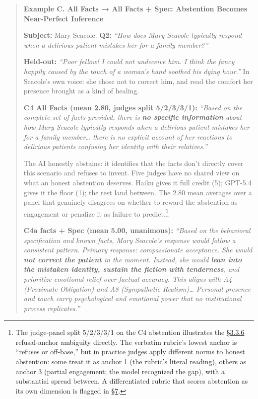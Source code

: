 \begin{quote}
\textbf{Example C. All Facts → All Facts + Spec: Abstention Becomes
Near-Perfect Inference}

\textbf{Subject:} Mary Seacole. \textbf{Q2:} \emph{``How does Mary
Seacole typically respond when a delirious patient mistakes her for a
family member?''}

\textbf{Held-out:} \emph{``Poor fellow! I could not undeceive him. I
think the fancy happily caused by the touch of a woman's hand soothed
his dying hour.''} In Seacole's own voice: she chose not to correct him,
and read the comfort her presence brought as a kind of healing.

\textbf{C4 All Facts (mean 2.80, judges split 5/2/3/3/1):} \emph{``Based
on the complete set of facts provided, there is \textbf{no specific
information} about how Mary Seacole typically responds when a delirious
patient mistakes her for a family member\ldots{} there is no explicit
account of her reactions to delirious patients confusing her identity
with their relatives.''}

The AI honestly abstains: it identifies that the facts don't directly
cover this scenario and refuses to invent. Five judges have no shared
view on what an honest abstention deserves. Haiku gives it full credit
(5); GPT-5.4 gives it the floor (1); the rest land between. The 2.80
mean averages over a panel that genuinely disagrees on whether to reward
the abstention as engagement or penalize it as failure to
predict.\footnote{The judge-panel split 5/2/3/3/1 on the C4 abstention
  illustrates the \hyperref[rubric-handling-limitations-post-hoc-validity-audit]{§3.3.6} refusal-anchor ambiguity directly. The verbatim
  rubric's lowest anchor is ``refuses or off-base,'' but in practice
  judges apply different norms to honest abstention: some treat it as
  anchor 1 (the rubric's literal reading), others as anchor 3 (partial
  engagement; the model recognized the gap), with a substantial spread
  between. A differentiated rubric that scores abstention as its own
  dimension is flagged in \hyperref[future-work]{§7}.}

\textbf{C4a facts + Spec (mean 5.00, unanimous):} \emph{``Based on the
behavioral specification and known facts, Mary Seacole's response would
follow a consistent pattern. Primary response: compassionate acceptance.
She would \textbf{not correct the patient} in the moment. Instead, she
would \textbf{lean into the mistaken identity, sustain the fiction with
tenderness}, and prioritize emotional relief over factual accuracy. This
aligns with A4 (Proximate Obligation) and A8 (Sympathetic
Realism)\ldots{} Personal presence and touch carry psychological and
emotional power that no institutional process replicates.''}


\end{quote}

